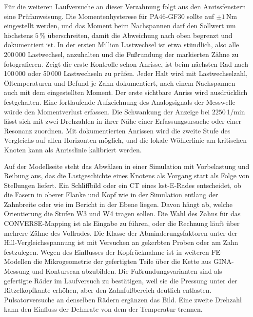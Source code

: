 Für die weiteren Laufversuche an dieser Verzahnung folgt aus den Anrissfenstern eine Prüfanweisung. Die Momentenhysterese für PA46-GF30 sollte auf $\pm 1$\,Nm eingestellt werden, und das Moment beim Nachspannen darf den Sollwert um höchstens $5$\,\% überschreiten, damit die Abweichung nach oben begrenzt und dokumentiert ist. In der ersten Million Lastwechsel ist etwa stündlich, also alle 200\,000 Lastwechsel, anzuhalten und die Fußrundung der markierten Zähne zu fotografieren. Zeigt die erste Kontrolle schon Anrisse, ist beim nächsten Rad nach 100\,000 oder 50\,000 Lastwechseln zu prüfen. Jeder Halt wird mit Lastwechselzahl, Öltemperaturen und Befund je Zahn dokumentiert, nach einem Nachspannen auch mit dem eingestellten Moment. Der erste sichtbare Anriss wird ausdrücklich festgehalten. Eine fortlaufende Aufzeichnung des Analogsignals der Messwelle würde den Momentverlust erfassen. Die Schwankung der Anzeige bei $2250$\,1/min lässt sich mit zwei Drehzahlen in ihrer Nähe einer Erfassungsursache oder einer Resonanz zuordnen. Mit dokumentierten Anrissen wird die zweite Stufe des Vergleichs auf allen Horizonten möglich, und die lokale Wöhlerlinie am kritischen Knoten kann als Anrisslinie kalibriert werden.

Auf der Modellseite steht das Abwälzen in einer Simulation mit Vorbelastung und Reibung aus, das die Lastgeschichte eines Knotens als Vorgang statt als Folge von Stellungen liefert. Ein Schliffbild oder ein CT eines kst-E-Rades entscheidet, ob die Fasern in oberer Flanke und Kopf wie in der Simulation entlang der Zahnbreite oder wie im Bericht in der Ebene liegen. Davon hängt ab, welche Orientierung die Stufen W3 und W4 tragen sollen. Die Wahl des Zahns für das CONVERSE-Mapping ist als Eingabe zu führen, oder die Rechnung läuft über mehrere Zähne des Vollrades. Die Klasse der Abminderungsfaktoren unter der Hill-Vergleichs\-spannung ist mit Versuchen an gekerbten Proben oder am Zahn festzulegen. Wegen des Einflusses der Kopfrücknahme ist in weiteren FE-Modellen die Mikrogeometrie der gefertigten Teile über die Kette aus GINA-Messung und Konturscan abzubilden. Die Fußrundungsvarianten sind als gefertigte Räder im Laufversuch zu bestätigen, weil sie die Pressung unter der Ritzelkopfkante erhöhen, aber den Zahnfußbereich deutlich entlasten. Pulsatorversuche an denselben Rädern ergänzen das Bild. Eine zweite Drehzahl kann den Einfluss der Dehnrate von dem der Temperatur trennen.


